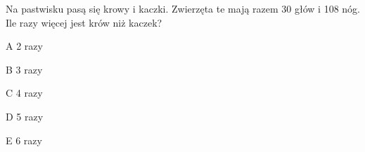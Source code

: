 \begin{tresc}
Na pastwisku pasą się krowy i kaczki. Zwierzęta te mają razem 30 głów i 108 nóg. Ile razy więcej jest krów niż kaczek?
\end{tresc}
\begin{wariant}{A} 2 razy \end{wariant}
\begin{wariant}{B} 3 razy \end{wariant}
\begin{wariant}{C} 4 razy \end{wariant}
\begin{wariant}{D} 5 razy \end{wariant}
\begin{wariant}{E} 6 razy \end{wariant}
